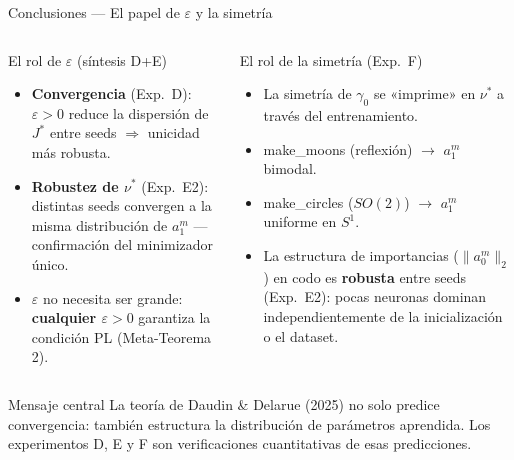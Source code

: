 \documentclass[10pt]{beamer}
\begin{document}
\begin{frame}{Conclusiones — El papel de $\varepsilon$ y la simetría}

\begin{columns}
\begin{block}{El rol de $\varepsilon$ (síntesis D+E)}
  \begin{itemize}
    \item \textbf{Convergencia} (Exp.\ D): $\varepsilon>0$ reduce la dispersión de $J^*$ entre seeds $\Rightarrow$ unicidad más robusta.
    \medskip
    \item \textbf{Robustez de $\nu^*$} (Exp.\ E2): distintas seeds convergen a la misma distribución de $a_1^m$ — confirmación del minimizador único.
    \medskip
    \item $\varepsilon$ no necesita ser grande: \textbf{cualquier $\varepsilon>0$} garantiza la condición PL (Meta-Teorema 2).
  \end{itemize}
\end{block}

\begin{block}{El rol de la simetría (Exp.\ F)}
  \begin{itemize}
    \item La simetría de $\gamma_0$ se «imprime» en $\nu^*$ a través del entrenamiento.
    \medskip
    \item make\_moons (reflexión) $\to$ $a_1^m$ bimodal.
    \medskip
    \item make\_circles ($SO(2)$) $\to$ $a_1^m$ uniforme en $S^1$.
    \medskip
    \item La estructura de importancias ($\|a_0^m\|_2$) en codo es \textbf{robusta} entre seeds (Exp.\ E2): pocas neuronas dominan independientemente de la inicialización o el dataset.
  \end{itemize}
\end{block}
\end{columns}

\bigskip
\begin{alertblock}{Mensaje central}
  La teoría de Daudin \& Delarue (2025) no solo predice convergencia: también estructura la distribución de parámetros aprendida. Los experimentos D, E y F son verificaciones cuantitativas de esas predicciones.
\end{alertblock}

\end{frame}
\end{document}
